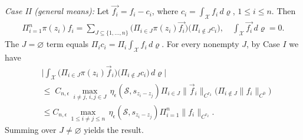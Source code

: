 \documentclass[11 pt]{amsart}
\newcommand{\norm}[1]{\lVert#1\rVert}
\theoremstyle{definition}
\numberwithin{equation}{section}
\begin{document}
\smallskip
\emph{Case II (general means):} Let $\vec{f_i}=f_i-c_i$, where $c_i=\int_{\mathcal{X}} f_i \, d\varrho$, $1\leq i\leq n$.
Then
\begin{align*}
\Pi_{i=1}^n \pi(z_i)f_i=\sum_{J\subseteq\{1,\dots,n\}}
\big(\Pi_{i\in J}\pi(z_i)\vec{f_i} \big)
\big(\Pi_{i\notin J} c_i\big),\quad \int_{\mathcal{X}} \vec{f_i} \, d\varrho=0.
\end{align*}
The $J=\varnothing$ term equals $\Pi_i c_i=\Pi_i\int_{\mathcal X}f_i\,d\varrho$.
For every nonempty $J$,  by Case $I$ we have
\begin{align*}
&\Big|\int_{\mathcal X}\big(\Pi_{i\in J}\pi(z_i)\vec f_i\big)
\big(\Pi_{i\notin J} c_i\big)\,d\varrho\Big|\\
&\le\;
C_{n,\epsilon}\,\max_{ i\neq j,\,i,j\in J} \,\eta_{\epsilon}(\mathcal{S}, s_{z_i-z_j})\Pi_{i\in J}\|\vec f_i\|_{C^{r_2}}\big(\Pi_{i\notin J} \norm{f_i}_{C^0}\big)\\
 &\le  C_{n,\epsilon}\,\max_{1\le i\neq j\le n} \,\eta_{\epsilon}(\mathcal{S}, s_{z_i-z_j})\Pi_{i=1}^n\|f_i\|_{C^{r_2}}.
\end{align*}
Summing over $J\neq\varnothing$
yields the result.
\end{document}
